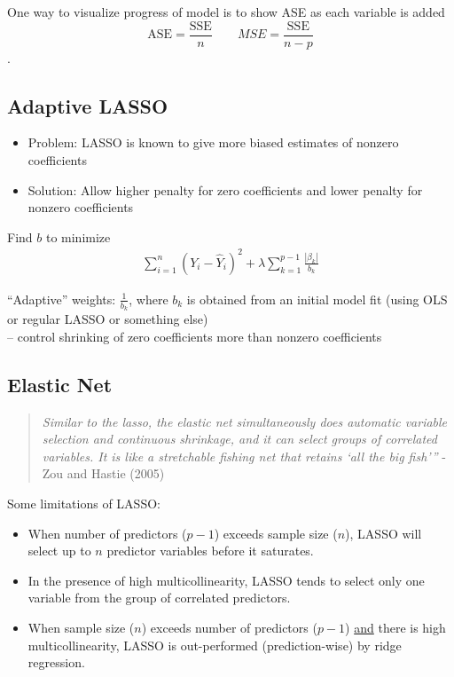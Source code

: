 \documentclass[12pt]{../notes}
\begin{document}
One way to visualize progress of model is to show ASE as each variable is added\\ \vspace{4em}
$$\text{ASE} = \frac{\text{SSE}}{n} \qquad MSE = \frac{\text{SSE}}{n-p}$$. 

\subsection{Adaptive LASSO}
\begin{itemize}
 \item  Problem: LASSO is known to give more biased estimates of nonzero coefficients
 \item  Solution: Allow higher penalty for zero coefficients and lower penalty for nonzero coefficients
\end{itemize}

\vspace{1em}

Find $b$ to minimize
  \begin{eqnarray}
    \sum_{i=1}^{n} \left( Y_i - \hat{Y}_i \right)^2 + \lambda \sum_{k=1}^{p-1} \frac{|\beta_k|}{b_k} \nonumber
  \end{eqnarray}

\vspace{1em}

``Adaptive'' weights: $\frac{1}{b_k}$, where $b_k$ is obtained from an initial model fit (using OLS or regular LASSO or something else) \\
-- control shrinking of zero coefficients more than nonzero coefficients\\

\subsection{Elastic Net}
\begin{quotation}
\textit{Similar to the lasso, the elastic net simultaneously does automatic variable selection and continuous shrinkage, and it can select groups of correlated variables. It is like a stretchable fishing net that retains ‘all the big fish’”} - Zou and Hastie (2005)
\end{quotation}

Some limitations of LASSO:
\begin{itemize}
  \item When number of predictors ($p-1$) exceeds sample size ($n$), LASSO will select up to $n$ predictor variables before it saturates.\\ \vspace{1em} %
  \item In the presence of high multicollinearity, LASSO tends to select only one variable from the group of correlated predictors.\\ \vspace{1em} %
  \item When sample size ($n$) exceeds number of predictors ($p-1$) \underline{and} there is high multicollinearity, LASSO is out-performed (prediction-wise) by ridge regression.
\end{itemize}
\end{document}
